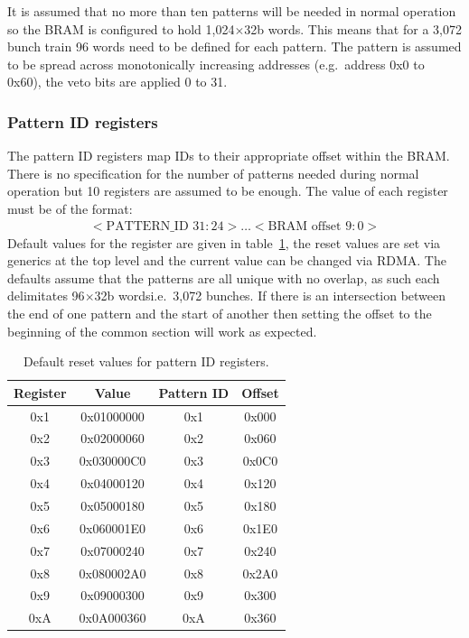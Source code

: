It is assumed that no more than ten patterns will be needed in normal operation so the BRAM is configured to hold 1,024\( \times  \)32b words. This means that for a 3,072 bunch train 96 words need to be defined for each pattern. The pattern is assumed to be spread across monotonically increasing addresses (e.g.\ address 0x0 to 0x60), the veto bits are applied 0 to 31. 
\subsubsection{Pattern ID registers} %
\label{sub:pattern_id_registers}
The pattern ID registers map IDs to their appropriate offset within the BRAM. There is no specification for the number of patterns needed during normal operation but 10 registers are assumed to be enough. The value of each register must be of the format:
\begin{align} \label{fmt:pattern_id}
  <\text{PATTERN\_ID } 31:24>\ldots<\text{BRAM offset } 9:0> 
\end{align}
Default values for the register are given in table~\ref{tab:default_pattern_id_reg}, the reset values are set via generics at the top level and the current value can be changed via RDMA. The defaults assume that the patterns are all unique with no overlap, as such each delimitates 96\( \times \)32b wordsi.e.\  3,072 bunches. If there is an intersection between the end of one pattern and the start of another then setting the offset to the beginning of the common section will work as expected.
\begin{table}[htbp]
  \begin{center}
    \begin{tabular}{c|c|c|c}
      Register & Value      & Pattern ID & Offset \\
      \hline
      0x1      & 0x01000000 & 0x1        & 0x000  \\ 
      0x2      & 0x02000060 & 0x2        & 0x060  \\  
      0x3      & 0x030000C0 & 0x3        & 0x0C0  \\ 
      0x4      & 0x04000120 & 0x4        & 0x120  \\ 
      0x5      & 0x05000180 & 0x5        & 0x180  \\ 
      0x6      & 0x060001E0 & 0x6        & 0x1E0  \\ 
      0x7      & 0x07000240 & 0x7        & 0x240  \\ 
      0x8      & 0x080002A0 & 0x8        & 0x2A0  \\ 
      0x9      & 0x09000300 & 0x9        & 0x300  \\ 
      0xA      & 0x0A000360 & 0xA        & 0x360  \\ 
    \end{tabular}
  \end{center}
  \caption{Default reset values for pattern ID registers.}
  \label{tab:default_pattern_id_reg}
\end{table}
